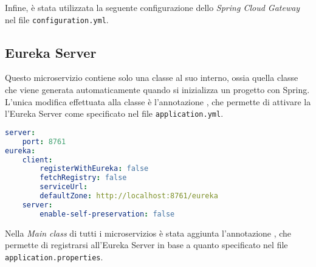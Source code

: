 

\noindent Infine, è stata utilizzata la seguente configurazione dello
\textit{Spring Cloud Gateway} nel file \texttt{configuration.yml}.




\subsection{Eureka Server}
Questo \gls{microservizio} contiene solo una classe al suo interno, ossia
quella
classe che viene generata automaticamente quando si inizializza un progetto con
Spring. L'unica modifica effettuata alla classe è l'annotazione
, che permette di  attivare la l'\gls{Eureka Server}
come specificato nel file \texttt{application.yml}.

\begin{lstlisting}[language = yaml, caption = {File \texttt{application.yml} del microservizio \texttt{Eureka Server}}]
server:
    port: 8761
eureka:
    client:
        registerWithEureka: false 
        fetchRegistry: false
        serviceUrl:
        defaultZone: http://localhost:8761/eureka
    server:
        enable-self-preservation: false
\end{lstlisting}
\noindent Nella \textit{Main class} di tutti i \glspl{microservizio}  è stata
aggiunta l'annotazione , che permette di registrarsi
all'\gls{Eureka Server} in base a quanto specificato nel file
\texttt{application.properties}.\\

